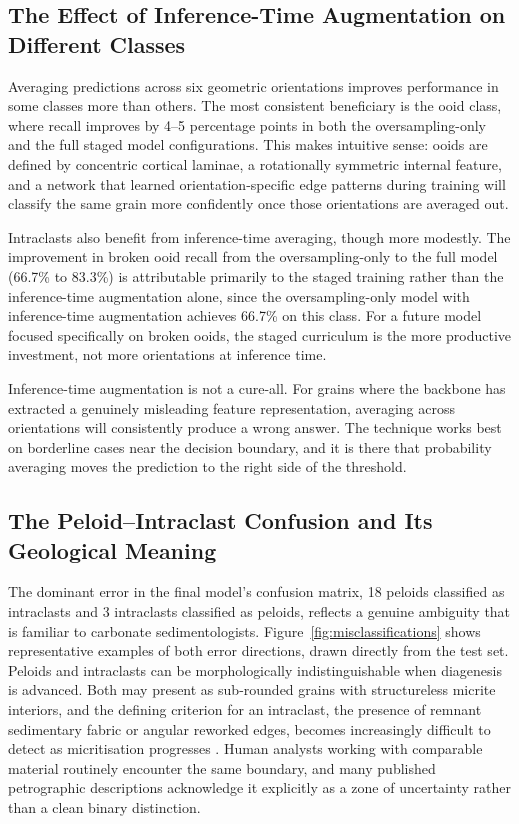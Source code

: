\documentclass[a4paper,fleqn]{cas-dc}
\begin{document}
\subsection{The Effect of Inference-Time Augmentation on Different Classes}
Averaging predictions across six geometric orientations improves performance in some classes more than others. The most consistent beneficiary is the ooid class, where recall improves by 4--5 percentage points in both the oversampling-only and the full staged model configurations. This makes intuitive sense: ooids are defined by concentric cortical laminae, a rotationally symmetric internal feature, and a network that learned orientation-specific edge patterns during training will classify the same grain more confidently once those orientations are averaged out.

Intraclasts also benefit from inference-time averaging, though more modestly. The improvement in broken ooid recall from the oversampling-only to the full model (66.7\% to 83.3\%) is attributable primarily to the staged training rather than the inference-time augmentation alone, since the oversampling-only model with inference-time augmentation achieves 66.7\% on this class. For a future model focused specifically on broken ooids, the staged curriculum is the more productive investment, not more orientations at inference time.

Inference-time augmentation is not a cure-all. For grains where the backbone has extracted a genuinely misleading feature representation, averaging across orientations will consistently produce a wrong answer. The technique works best on borderline cases near the decision boundary, and it is there that probability averaging moves the prediction to the right side of the threshold.

\subsection{The Peloid--Intraclast Confusion and Its Geological Meaning}
The dominant error in the final model's confusion matrix, 18 peloids classified as intraclasts and 3 intraclasts classified as peloids, reflects a genuine ambiguity that is familiar to carbonate sedimentologists. Figure~\ref{fig:misclassifications} shows representative examples of both error directions, drawn directly from the test set. Peloids and intraclasts can be morphologically indistinguishable when diagenesis is advanced. Both may present as sub-rounded grains with structureless micrite interiors, and the defining criterion for an intraclast, the presence of remnant sedimentary fabric or angular reworked edges, becomes increasingly difficult to detect as micritisation progresses \citep{flugel2010}. Human analysts working with comparable material routinely encounter the same boundary, and many published petrographic descriptions acknowledge it explicitly as a zone of uncertainty rather than a clean binary distinction.
\end{document}
